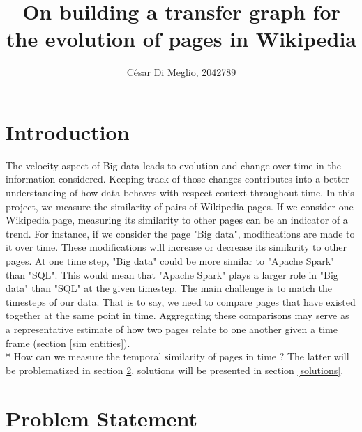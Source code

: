 \documentclass[sigconf]{acmart}
\begin{document}
\title{On building a transfer graph for the evolution of pages in Wikipedia}



\author{César Di Meglio, 2042789}




\maketitle

\section{Introduction}
The velocity aspect of Big data leads to evolution and change over time in the information considered. Keeping track of those changes contributes into a better understanding of how data behaves with respect context throughout time. In this project, we measure the similarity of pairs of Wikipedia pages. If we consider one Wikipedia page, measuring its similarity to other pages can be an indicator of a trend. For instance, if we consider the page "Big data", modifications are made to it over time. These modifications will increase or decrease its similarity to other pages. At one time step, "Big data" could be more similar to "Apache Spark" than "SQL". This would mean that "Apache Spark" plays a larger role in "Big data" than "SQL" at the given timestep. The main challenge is to match the timesteps of our data. That is to say, we need to compare pages that have existed together at the same point in time. Aggregating these comparisons may serve as a representative estimate of how two pages relate to one another given a time frame (section \ref{sim entities}).\\*
How can we measure the temporal similarity of pages in time ?
The latter will be problematized in section \ref{problem}, solutions will be presented in section \ref{solutions}.
\section{Problem Statement}
\label{problem}
\end{document}
